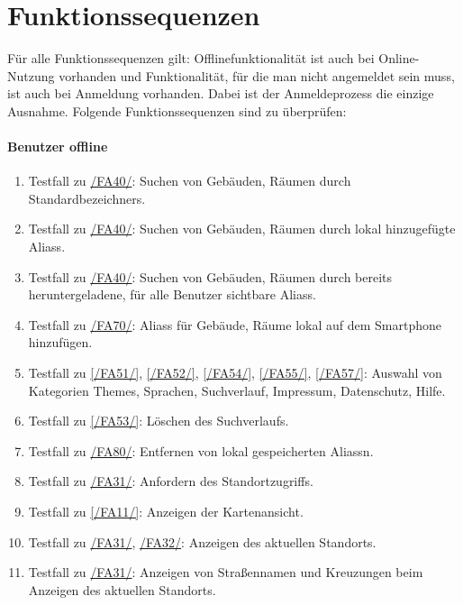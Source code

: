 \section{Funktionssequenzen}

Für alle Funktionssequenzen gilt:
Offlinefunktionalität ist auch bei Online-Nutzung vorhanden und Funktionalität, für die man nicht angemeldet sein muss, ist auch bei Anmeldung vorhanden. Dabei ist der Anmeldeprozess die einzige Ausnahme.
Folgende Funktionssequenzen sind zu überprüfen:

\paragraph{\Gls{Benutzer} offline}
\begin{enumerate}[label=\textbf{/T\arabic*0/}, align=left]
	\item \label{/T10/} Testfall zu \hyperref[/FA40/]{/FA40/}: Suchen von Gebäuden, Räumen durch \Glspl{Standardbezeichner}.
	\item \label{/T20/} Testfall zu \hyperref[/FA40/]{/FA40/}: Suchen von Gebäuden, Räumen durch \gls{lokal} hinzugefügte \Glspl{Alias}.
	\item \label{/T30/} Testfall zu \hyperref[/FA40/]{/FA40/}: Suchen von Gebäuden, Räumen durch bereits heruntergeladene, für alle Benutzer sichtbare \Glspl{Alias}.
	\item \label{/T40/} Testfall zu \hyperref[/FA70/]{/FA70/}: \Glspl{Alias} für Gebäude, Räume \gls{lokal} auf dem Smartphone hinzufügen.
	\item \label{/T50/} Testfall zu \ref{/FA51/}, \ref{/FA52/}, \ref{/FA54/}, \ref{/FA55/}, \ref{/FA57/}: Auswahl von Kategorien \Glspl{Theme}, Sprachen, Suchverlauf, Impressum, Datenschutz, Hilfe.
	\item \label{/T60/} Testfall zu \ref{/FA53/}: Löschen des Suchverlaufs.
	\item \label{/T70/} Testfall zu \hyperref[/FA80/]{/FA80/}: Entfernen von \gls{lokal} gespeicherten \Glspl{Alias}n.
	\item \label{/T80/} Testfall zu \hyperref[/FA31/]{/FA31/}: Anfordern des Standortzugriffs.
	\item \label{/T90/} Testfall zu \ref{/FA11/}: Anzeigen der \Gls{Kartenansicht}.
	\item \label{/T100/} Testfall zu \hyperref[/FA31/]{/FA31/}, \hyperref[/FA32/]{/FA32/}: Anzeigen des aktuellen Standorts.
	\item \label{/T110/} Testfall zu \hyperref[/FA31/]{/FA31/}: Anzeigen von Straßennamen und Kreuzungen beim Anzeigen des aktuellen Standorts.

\end{enumerate}
